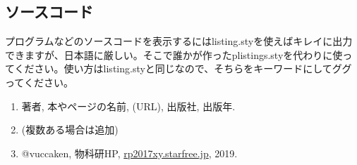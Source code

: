 \documentclass[10pt,b5paper,papersize,dvipdfmx]{jsbook}
\begin{document}
%
\subsection{ソースコード}
プログラムなどのソースコードを表示するにはlisting.styを使えばキレイに出力できますが、日本語に厳しい。そこで誰かが作ったplistings.styを代わりに使ってください。使い方はlisting.styと同じなので、そちらをキーワードにしてググってください。

\begin{sanko}
  \begin{enumerate}
    \item 著者, 本やページの名前, (URL), 出版社, 出版年.
    \item (複数ある場合は追加)
    \item @vuccaken, 物科研HP, \url{rp2017xy.starfree.jp}, 2019.
  \end{enumerate}
\end{sanko}
\end{document}
